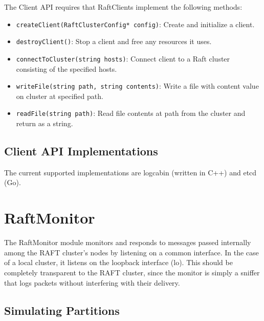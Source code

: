 \documentclass[UTF8]{article}
\begin{document}
The Client API requires that RaftClients implement the following methods:

\begin{itemize}
\item \texttt{createClient(RaftClusterConfig* config)}: Create and initialize a client.
\item \texttt{destroyClient()}: Stop a client and free any resources it uses.
\item \texttt{connectToCluster(string hosts)}: Connect client to a Raft cluster consisting of the specified hosts.
\item \texttt{writeFile(string path, string contents)}: Write a file with content value on cluster at specified path.
\item \texttt{readFile(string path)}: Read file contents at path from the cluster and return as a string.
\end{itemize}

\subsection{Client API Implementations}

The current supported implementations are logcabin (written in C++) and etcd (Go).

\section{RaftMonitor}

The RaftMonitor module monitors and responds to messages passed internally among the RAFT cluster's nodes by listening on a common interface. In the case of a local cluster, it listens on the loopback interface (lo). This should be completely transparent to the RAFT cluster, since the monitor is simply a sniffer that logs packets without interfering with their delivery. 

\subsection{Simulating Partitions}
\end{document}

